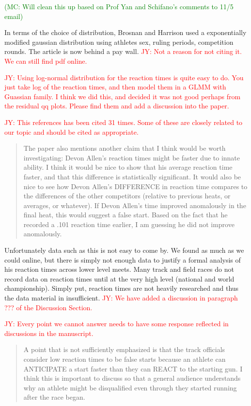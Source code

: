 \documentclass[12pt]{article}
\newcommand{\jy}[1]{\textcolor{red}{JY: #1}}
\newcommand{\of}[1]{\textcolor{green}{(MC: #1)}}
\newenvironment{comment}%
{\begin{quotation}\noindent\small\it\color{darkblue}\ignorespaces%
}{\end{quotation}}
\begin{document}
\of{Will clean this up based on Prof Yan and Schifano's comments to 11/5 email}

In terms of the choice of distribution, Brosnan and Harrison used a exponentially
modified gaussian distribution using athletes sex, ruling periods, competition
rounds. The article is now behind a pay wall.
\jy{Not a reason for not citing it. We can still find pdf online.}

\jy{Using log-normal distribution for the reaction times is quite easy
  to do. You just take log of the reaction times, and then model them
  in a GLMM with Guassian family. I think we did this, and decided it
  was not good perhaps from the residual qq plots. Please find them
  and add a discussion into the paper.}

\jy{This references has been cited 31 times. Some of these are closely
  related to our topic and should be cited as appropriate.}

\begin{comment}
The paper also mentions another claim that I think would be worth investigating:
Devon Allen’s reaction times might be faster due to innate ability. I think it
would be nice to show that his average reaction time faster, and that this
difference is statistically significant. It would also be nice to see how Devon
Allen’s DIFFERENCE in reaction time compares to the differences of the other
competitors (relative to previous heats, or averages, or whatever). If Devon
Allen’s time improved anomalously in the final heat, this would suggest a false
start. Based on the fact that he recorded a .101 reaction time earlier, I am
guessing he did not improve anomalously.  
\end{comment}

Unfortunately data such as this is not easy to come by.  We found as much as we
could online, but there is simply not enough data to justify a formal analysis
of his reaction times across lower level meets.  Many track and field races do
not record data on reaction times until at the very high level (national
and world championship).  Simply put, reaction times are not heavily researched
and thus the data material in insufficient.
\jy{We have added a discussion in paragraph ??? of the Discussion Section.}

\jy{Every point we cannot answer needs to have some response reflected
  in discussions in the manuscript.}

\begin{comment}
A point that is not sufficiently emphasized is that the track officials consider
low reaction times to be false starts because an athlete can ANTICIPATE a start
faster than they can REACT to the starting gun. I think this is important to
discuss so that a general audience understands why an athlete might be
disqualified even through they started running after the race began.  
\end{comment}
\end{document}
